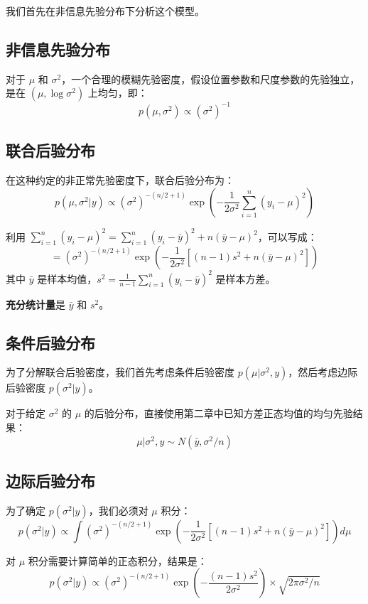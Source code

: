我们首先在非信息先验分布下分析这个模型。

\subsection{非信息先验分布}

对于 $\mu$ 和 $\sigma^2$，一个合理的模糊先验密度，假设位置参数和尺度参数的先验独立，是在 $(\mu, \log \sigma^2)$ 上均匀，即：
\[
p(\mu, \sigma^2) \propto (\sigma^2)^{-1}
\]

\subsection{联合后验分布}

在这种约定的非正常先验密度下，联合后验分布为：
\[
p(\mu, \sigma^2 | y) \propto (\sigma^2)^{-(n/2+1)} \exp\left(-\frac{1}{2\sigma^2} \sum_{i=1}^n (y_i - \mu)^2\right)
\]

利用 $\sum_{i=1}^n (y_i - \mu)^2 = \sum_{i=1}^n (y_i - \bar{y})^2 + n(\bar{y} - \mu)^2$，可以写成：
\[
= (\sigma^2)^{-(n/2+1)} \exp\left(-\frac{1}{2\sigma^2}\left[(n-1)s^2 + n(\bar{y} - \mu)^2\right]\right)
\]
其中 $\bar{y}$ 是样本均值，$s^2 = \frac{1}{n-1}\sum_{i=1}^n (y_i - \bar{y})^2$ 是样本方差。

\textbf{充分统计量}是 $\bar{y}$ 和 $s^2$。

\subsection{条件后验分布}

为了分解联合后验密度，我们首先考虑条件后验密度 $p(\mu | \sigma^2, y)$，然后考虑边际后验密度 $p(\sigma^2 | y)$。

对于给定 $\sigma^2$ 的 $\mu$ 的后验分布，直接使用第二章中已知方差正态均值的均匀先验结果：
\[
\mu | \sigma^2, y \sim N(\bar{y}, \sigma^2 / n)
\]

\subsection{边际后验分布}

为了确定 $p(\sigma^2 |y)$，我们必须对 $\mu$ 积分：
\[
p(\sigma^2 | y) \propto \int (\sigma^2)^{-(n/2+1)} \exp\left(-\frac{1}{2\sigma^2}\left[(n-1)s^2 + n(\bar{y} - \mu)^2\right]\right) d\mu
\]

对 $\mu$ 积分需要计算简单的正态积分，结果是：
\[
p(\sigma^2 | y) \propto (\sigma^2)^{-(n/2+1)} \exp\left(-\frac{(n-1)s^2}{2\sigma^2}\right) \times \sqrt{2\pi\sigma^2/n}
\]

